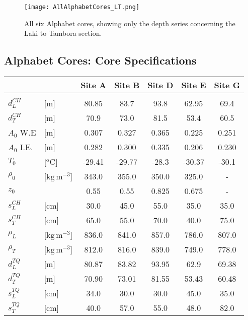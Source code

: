 \documentclass[../../CompleteThesis2/Complete_2ndDraft.tex]{subfiles}
\begin{document}
	\begin{figure}[H]
		\centering
		\texttt{[image: AllAlphabetCores\_LT.png]}
		\caption[Alphabet cores, Laki to Tambora depth.]{\small All six Alphabet cores, showing only the depth series concerning the Laki to Tambora section.}
		\label{fig:AllAlphabetCores_LT}
	\end{figure}
	\newpage
	
	\subsection[Core Specifications]{Alphabet Cores: Core Specifications}
	\begin{table}[h]
		\centering
		\begin{tabular}{l l|c c c c c}
			& & \textbf{Site A}& \textbf{Site B}& \textbf{Site D}& \textbf{Site E}& \textbf{Site G} \\[0.1cm]
			\hline 
			&&&&&& \\
			$d_{L}^{CH}$ & [m] & 80.85 & 83.7 & 93.8 & 62.95 & 69.4 \\[0.15cm]
			$d_{T}^{CH}$ & [m] & 70.9 & 73.0 & 81.5 & 53.4 & 60.5 \\[0.15cm]
			$A_0$ W.E & [m] & 0.307 & 0.327 & 0.365 & 0.225 & 0.251 \\[0.15cm]
			$A_0$ I.E. & [m] & 0.282 & 0.300 & 0.335 & 0.206 & 0.230 \\[0.15cm]
			$T_0$ & [$^{\text{o}}$C] & -29.41 & -29.77 & -28.3 & -30.37 & -30.1 \\[0.15cm]
			$\rho_0$ & [$\text{kg}\,\text{m}^{-3}$] & 343.0 & 355.0 & 350.0 & 325.0 & - \\[0.15cm]
			$z_0$ & & 0.55 & 0.55 & 0.825 & 0.675 & - \\[0.15cm]
			$s_L^{CH}$ & [cm] & 30.0 & 45.0 & 55.0 & 35.0 & 35.0 \\[0.15cm]
			$s_T^{CH}$ & [cm] & 65.0 & 55.0 & 70.0 & 40.0 & 75.0 \\[0.15cm]
			$\rho_L$ & [$\text{kg}\,\text{m}^{-3}$] & 836.0 & 841.0 & 857.0 & 786.0 & 807.0 \\[0.15cm]
			$\rho_T$ & [$\text{kg}\,\text{m}^{-3}$] & 812.0 & 816.0 & 839.0 & 749.0 & 778.0 \\[0.15cm]		
			$d_{L}^{TQ}$ & [m] & 80.87 & 83.82 & 93.95 & 62.9 & 69.38 \\[0.15cm]
			$d_{T}^{TQ}$ & [m] & 70.90 & 73.01 & 81.55 & 53.43 & 60.48\\[0.15cm]
			$s_L^{TQ}$ & [cm] & 34.0 & 30.0 & 30.0 & 45.0 & 35.0 \\[0.15cm]
			$s_T^{TQ}$ & [cm] & 40.0 & 57.0 & 55.0 & 48.0 & 82.0 \\[0.15cm]
			

\end{tabular}
\end{table}
\end{document}
